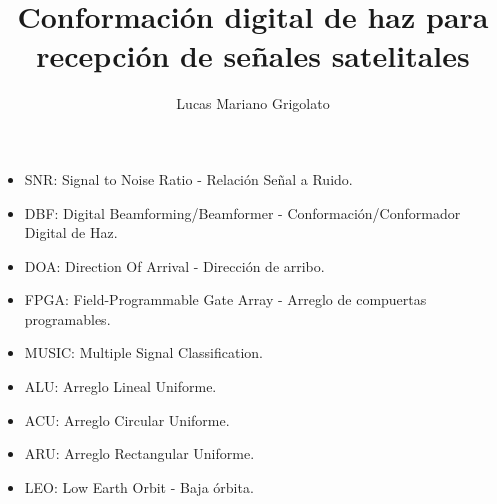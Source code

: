 \documentclass[screen,pagebackref]{ibtesis}
\title{Conformación digital de haz para recepción de señales satelitales}
\author{Lucas Mariano Grigolato}
\begin{document}

\begin{preliminary}



    \begin{abreviaturas}
        \begin{itemize}
            \item SNR: Signal to Noise Ratio - Relación Señal a Ruido.
            \item DBF: Digital Beamforming/Beamformer - Conformación/Conformador Digital de Haz.
            \item DOA: Direction Of Arrival - Dirección de arribo.
            \item FPGA: Field-Programmable Gate Array - Arreglo de compuertas programables.
            \item MUSIC: Multiple Signal Classification.
            \item ALU: Arreglo Lineal Uniforme.
            \item ACU: Arreglo Circular Uniforme.
            \item ARU: Arreglo Rectangular Uniforme.
            \item LEO: Low Earth Orbit - Baja órbita.
        \end{itemize}

    \end{abreviaturas}

    \tableofcontents                %

    \listoffigures                  %

    \listoftables                   %

    

\end{preliminary}














\appendix


\begin{biblio}
    
\end{biblio}
\end{document}
